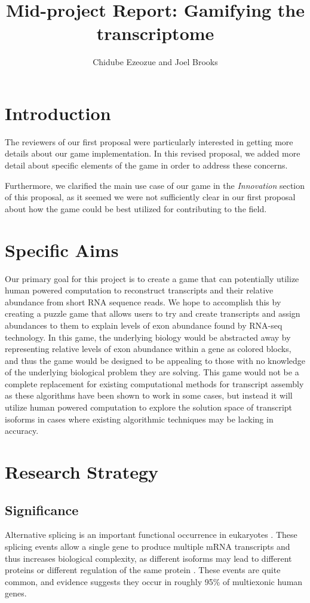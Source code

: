 \documentclass[12pt]{article}
\title{Mid-project Report: Gamifying the transcriptome}
\author{Chidube Ezeozue and Joel Brooks}
\begin{document}

\renewcommand\refname{Bibliography}
\maketitle

\section*{Introduction}
The reviewers of our first proposal were particularly interested in getting more details about our game implementation. In this revised proposal, we added more detail about specific elements of the game in order to address these concerns.

Furthermore, we clarified the main use case of our game in the \emph{Innovation} section of this proposal, as it seemed we were not sufficiently clear in our first proposal about how the game could be best utilized for contributing to the field.

\section*{Specific Aims}
Our primary goal for this project is to create a game that can potentially utilize human powered computation to reconstruct transcripts and their relative abundance from short RNA sequence reads. We hope to accomplish this by creating a puzzle game that allows users to try and create transcripts and assign abundances to them to explain levels of exon abundance found by RNA-seq technology. In this game, the underlying biology would be abstracted away by representing relative levels of exon abundance within a gene as colored blocks, and thus the game would be designed to be appealing to those with no knowledge of the underlying biological problem they are solving. This game would not be a complete replacement for existing computational methods for transcript assembly as these algorithms have been shown to work in some cases, but instead it will utilize human powered computation to explore the solution space of transcript isoforms in cases where existing algorithmic techniques may be lacking in accuracy.

\section*{Research Strategy}

\subsection*{Significance}
Alternative splicing is an important functional occurrence in eukaryotes \citep{pan2008deep}. These splicing events allow a single gene to produce multiple mRNA transcripts and thus increases biological complexity, as different isoforms may lead to different proteins or different regulation of the same protein \citep{trapnell2010transcript}. These events are quite common, and evidence suggests they occur in roughly 95\% of multiexonic human genes.
\end{document}
